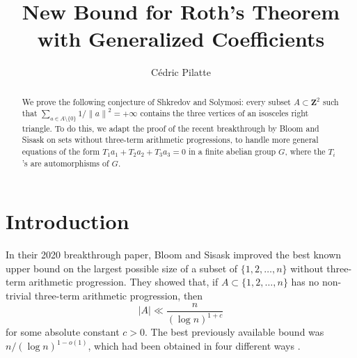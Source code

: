 \documentclass{daj}
\theoremstyle{definition}
\newcommand{\Z}{\ensuremath{\mathbf{Z}}}
\newcommand{\norm}[1]{\left\|#1\right\|}
\begin{document}
\begin{frontmatter}[classification=text]

\title{New Bound for Roth's Theorem\\with Generalized Coefficients} %

\author[pil]{C\'edric Pilatte}%

\begin{abstract}
We prove the following conjecture of Shkredov and Solymosi: every subset $A \subset \Z^2$ such that $\sum_{a\in A\setminus\{0\}} 1/\norm{a}^{2}   = +\infty$ contains the three vertices of an isosceles right triangle. To do this, we adapt the proof of the recent breakthrough by Bloom and Sisask on sets without three-term arithmetic progressions, to handle more general equations of the form $T_1a_1+T_2a_2+T_3a_3 = 0$ in a finite abelian group $G$, where the $T_i$'s are automorphisms of $G$. 
\end{abstract}
\end{frontmatter}

\section{Introduction}
\label{sec:intro}

In their 2020 breakthrough paper, Bloom and Sisask \cite{BS} improved the best known upper bound on the largest possible size of a subset of $\{1, 2, \dots, n\}$ without three-term arithmetic progression. They showed that, if $A \subset \{1, 2, \dots, n\}$ has no non-trivial three-term arithmetic progression, then 
\begin{equation*}
|A| \ll \frac{n}{(\log n)^{1+c}}
\end{equation*}
for some absolute constant $c>0$. The best previously available bound was ${n}/{(\log n)^{1-o(1)}}$, which had been obtained in four different ways \cite{sanders,bloomlondon,bsdiscrete,schoenrecent}.
\end{document}
